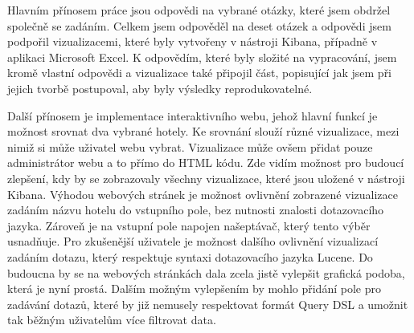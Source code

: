 \documentclass[czech,BP]{thesiskiv}
\begin{document}
Hlavním přínosem práce jsou odpovědi na vybrané otázky, které jsem obdržel společně se zadáním. Celkem jsem odpověděl na deset otázek a odpovědi jsem podpořil vizualizacemi, které byly vytvořeny v nástroji Kibana, případně v aplikaci Microsoft Excel. K odpovědím, které byly složité na vypracování, jsem kromě vlastní odpovědi a vizualizace také připojil část, popisující jak jsem při jejich tvorbě postupoval, aby byly výsledky reprodukovatelné. 


Další přínosem je implementace interaktivního webu, jehož hlavní funkcí je možnost srovnat dva vybrané hotely. Ke srovnání slouží různé vizualizace, mezi nimiž si může uživatel webu vybrat. Vizualizace může ovšem přidat pouze administrátor  webu a to přímo do HTML kódu. Zde vidím možnost pro budoucí zlepšení, kdy by se zobrazovaly všechny vizualizace, které jsou uložené v nástroji Kibana. Výhodou webových stránek je možnost ovlivnění zobrazené vizualizace zadáním názvu hotelu do vstupního pole, bez nutnosti znalosti  dotazovacího jazyka. Zároveň je na vstupní pole napojen našeptávač, který tento výběr usnadňuje. Pro  zkušenější uživatele je možnost dalšího ovlivnění vizualizací zadáním dotazu, který respektuje syntaxi dotazovacího jazyka Lucene. Do budoucna by se na webových stránkách dala zcela jistě vylepšit grafická podoba, která je nyní prostá. Dalším možným vylepšením by mohlo přidání pole pro zadávání dotazů, které by již nemusely respektovat formát Query DSL a umožnit tak běžným uživatelům více filtrovat data.
\end{document}
